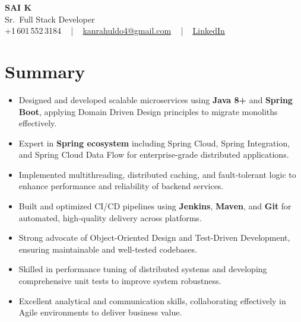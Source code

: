 \documentclass[letterpaper,11pt]{article}
\newcommand{\resumeItem}[1]{
  \item\footnotesize{
    {#1 \vspace{-2pt}}
  }
}
\newcommand{\resumeItemListStart}{\begin{itemize}[leftmargin=*]}
\newcommand{\resumeItemListEnd}{\end{itemize}\vspace{-5pt}}
\begin{document}
\begin{center}
    {\fontsize{14pt}{12pt}\selectfont \textbf{\MakeUppercase{Sai K}}}\\ \vspace{2pt}
    \fontsize{10pt}{12pt}\selectfont Sr.\ Full Stack Developer\\ \vspace{2pt}
    \fontsize{10pt}{12pt}\selectfont +1\,601\,552\,3184 ~ | ~
    \href{mailto:kanrahuldo4@gmail.com}{kanrahuldo4@gmail.com} ~ | ~
    \href{https://www.linkedin.com/in/srrrk/}{\color{blue}\underline{LinkedIn}}
    \vspace{-10pt}
\end{center}

\section{Summary}
\fontsize{9pt}{10pt}\selectfont
\resumeItemListStart
  \resumeItem{Designed and developed scalable microservices using \textbf{Java 8+} and \textbf{Spring Boot}, applying Domain Driven Design principles to migrate monoliths effectively.}
  \resumeItem{Expert in \textbf{Spring ecosystem} including Spring Cloud, Spring Integration, and Spring Cloud Data Flow for enterprise-grade distributed applications.}
  \resumeItem{Implemented multithreading, distributed caching, and fault-tolerant logic to enhance performance and reliability of backend services.}
  \resumeItem{Built and optimized CI/CD pipelines using \textbf{Jenkins}, \textbf{Maven}, and \textbf{Git} for automated, high-quality delivery across platforms.}
  \resumeItem{Strong advocate of Object-Oriented Design and Test-Driven Development, ensuring maintainable and well-tested codebases.}
  \resumeItem{Skilled in performance tuning of distributed systems and developing comprehensive unit tests to improve system robustness.}
  \resumeItem{Excellent analytical and communication skills, collaborating effectively in Agile environments to deliver business value.}
\resumeItemListEnd
\vspace{-6pt}

\end{document}

